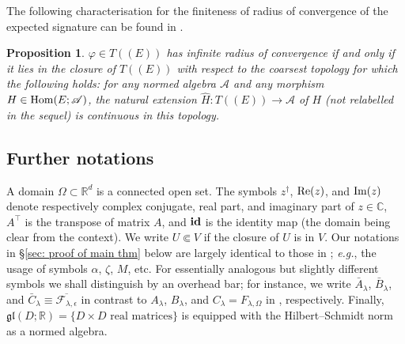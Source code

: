 \documentclass[11pt,a4paper,english,reqno]{amsart}
\theoremstyle{plain}
\newtheorem{remark}[definition]{Remark}
\newtheorem{proposition}[definition]{Proposition}
\newcommand{\R}{\mathbb{R}}
\newcommand{\C}{\mathbb{C}}
\newcommand{\e}{\epsilon}
\newcommand{\1}{\mathbbm{1}}
\begin{document}

The following characterisation for the finiteness of radius of convergence of the expected signature can be found in \cite{cl}.

\begin{proposition}\label{prop/def}
$\varphi \in T((E))$ has infinite radius of convergence if and only if it lies in the closure of $T((E))$ with respect to the coarsest topology for which the following holds: for any normed algebra $\mathscr{A}$ and any morphism $H \in {\rm Hom}(E;\mathscr{A})$, the natural extension $\hat{H}: T((E)) \to \mathscr{A}$ of $H$ (not relabelled in the sequel) is continuous in this topology.
\end{proposition}




\subsection{Further notations} A domain $\Omega \subset \R^d$ is a connected open set. The symbols $z^\dagger$, ${\rm Re}(z)$, and ${\rm Im}(z)$ denote respectively complex conjugate, real part, and imaginary part of $z \in \C$, $A^\top$ is the transpose of matrix $A$, and ${\bf id}$ is the identity map (the domain being clear from the context). We write $U \Subset V$ if the closure of $U$ is in $V$. Our notations in \S\ref{sec: proof of main thm} below are largely identical to  those in  \cite{boedihardjo2021expected}; \emph{e.g.}, the usage of symbols $\alpha$, $\zeta$, $M$, etc. For essentially analogous but slightly different symbols we shall distinguish by an overhead bar; for instance, we write $\bar{A}_\lambda$, $\bar{B}_\lambda$, and  $\bar{C}_\lambda \equiv \overline{\mathcal{F}_{\lambda,\e}}$ in contrast to $A_\lambda$, $B_\lambda$, and $C_\lambda={F}_{\lambda,\Omega}$ in \cite{boedihardjo2021expected}, respectively. Finally, $\mathfrak{gl}(D;\R) = \{ D \times D  \text{ real matrices}\}$ is equipped with the Hilbert--Schmidt norm as a normed algebra.
\end{document}
